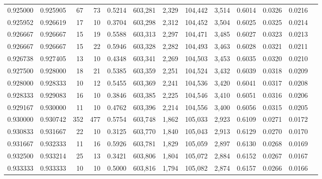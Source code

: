 \begin{tabular}{rrrrrrrrrrrrr}
0.925000 & 0.925905 &    67 &  73 &                                     0.5214 & 603,281 &   2,329 & 104,442 &   3,514 & 0.6014 & 0.0326 & 0.0216 \\
0.925952 & 0.926619 &    17 &  10 &                                     0.3704 & 603,298 &   2,312 & 104,452 &   3,504 & 0.6025 & 0.0325 & 0.0214 \\
0.926667 & 0.926667 &    15 &  19 &                                     0.5588 & 603,313 &   2,297 & 104,471 &   3,485 & 0.6027 & 0.0323 & 0.0213 \\
0.926667 & 0.926667 &    15 &  22 &                                     0.5946 & 603,328 &   2,282 & 104,493 &   3,463 & 0.6028 & 0.0321 & 0.0211 \\
0.926738 & 0.927405 &    13 &  10 &                                     0.4348 & 603,341 &   2,269 & 104,503 &   3,453 & 0.6035 & 0.0320 & 0.0210 \\
0.927500 & 0.928000 &    18 &  21 &                                     0.5385 & 603,359 &   2,251 & 104,524 &   3,432 & 0.6039 & 0.0318 & 0.0209 \\
0.928000 & 0.928333 &    10 &  12 &                                     0.5455 & 603,369 &   2,241 & 104,536 &   3,420 & 0.6041 & 0.0317 & 0.0208 \\
0.928333 & 0.929083 &    16 &  10 &                                     0.3846 & 603,385 &   2,225 & 104,546 &   3,410 & 0.6051 & 0.0316 & 0.0206 \\
0.929167 & 0.930000 &    11 &  10 &                                     0.4762 & 603,396 &   2,214 & 104,556 &   3,400 & 0.6056 & 0.0315 & 0.0205 \\
0.930000 & 0.930742 &   352 & 477 &                                     0.5754 & 603,748 &   1,862 & 105,033 &   2,923 & 0.6109 & 0.0271 & 0.0172 \\
0.930833 & 0.931667 &    22 &  10 &                                     0.3125 & 603,770 &   1,840 & 105,043 &   2,913 & 0.6129 & 0.0270 & 0.0170 \\
0.931667 & 0.932333 &    11 &  16 &                                     0.5926 & 603,781 &   1,829 & 105,059 &   2,897 & 0.6130 & 0.0268 & 0.0169 \\
0.932500 & 0.933214 &    25 &  13 &                                     0.3421 & 603,806 &   1,804 & 105,072 &   2,884 & 0.6152 & 0.0267 & 0.0167 \\
0.933333 & 0.933333 &    10 &  10 &                                     0.5000 & 603,816 &   1,794 & 105,082 &   2,874 & 0.6157 & 0.0266 & 0.0166 \\

\end{tabular}
